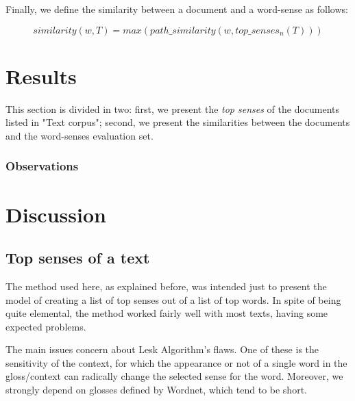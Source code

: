 \documentclass{pnastwo}
\begin{document}
\begin{article}
Finally, we define the similarity between a document and a word-sense as follows:

\begin{equation}
  similarity(w, T) = max(path\_similarity(w, top\_senses_n(T)))
\end{equation}



\section{Results}
This section is divided in two: first, we present the \textit{top senses} of the documents listed in "Text corpus"; second, we present the similarities between the documents and the word-senses evaluation set.






\subsubsection{Observations}

\section{Discussion}


\subsection{Top senses of a text}
The method used here, as explained before, was intended just to present the model of creating a list of top senses out of a list of top words. In spite of being quite elemental, the method worked fairly well with most texts, having some expected problems.

The main issues concern about Lesk Algorithm's flaws. One of these is the sensitivity of the context, for which the appearance or not of a single word in the gloss/context can radically change the selected sense for the word. Moreover, we strongly depend on glosses defined by Wordnet, which tend to be short.


\end{article}
\end{document}

